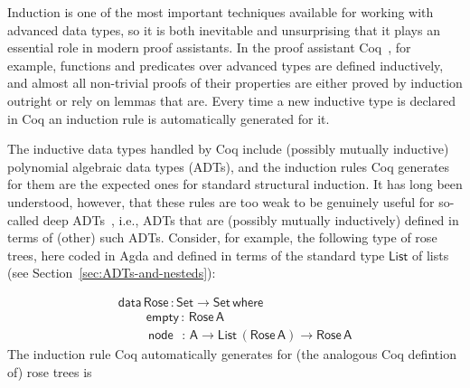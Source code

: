 \documentclass[9pt]{entcs}
\begin{document}
Induction is one of the most important techniques available for
working with advanced data types, so it is both inevitable and
unsurprising that it plays an essential role in modern proof
assistants. In the proof assistant Coq~\cite{coq20}, for example,
functions and predicates over advanced types are defined inductively,
and almost all non-trivial proofs of their properties are either
proved by induction outright or rely on lemmas that are.  Every time a
new inductive type is declared in Coq an induction rule is
automatically generated for it.

The inductive data types handled by Coq include (possibly mutually
inductive) polynomial algebraic data types (ADTs), and the induction
rules Coq generates for them are the expected ones for standard
structural induction. It has long been understood, however, that these
rules are too weak to be genuinely useful for so-called deep
ADTs~\cite{jp20}, i.e., ADTs that are (possibly mutually inductively)
defined in terms of (other) such ADTs.
Consider, for example, the following type of rose trees, here coded in
Agda and defined in terms of the standard type $\mathsf{List}$ of
lists (see Section~\ref{sec:ADTs-and-nesteds}):

\vspace*{-0.075in}

\[\begin{array}{l}
\mathsf{data\, Rose\, : Set \to Set\,where}\\
\mathsf{\;\;\;\;\;\;\;\;empty\, :\, Rose\,A}\\
\mathsf{\;\;\;\;\;\;\;\;\,node\,\,\,\, :\, A \to List\,(Rose\,A) \to Rose\,A} 
\end{array}\]
\noindent
The induction rule Coq automatically generates for (the analogous Coq
defintion of) rose trees is

\vspace*{-0.075in}
\end{document}
